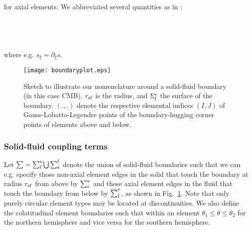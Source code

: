 %
\eqa \label{eq:scheme_wu_ax}
 \nonumber\\
\ena
%
for axial elements. We abbreviated several quantities as
in \citet[][Table~1]{nissen+:07b}:
%
\eqa
{}\nonumber\\
\nonumber\\
\nonumber\\
\nonumber\\
\nonumber\\
\nonumber
\ena
%
where e.g. $s_\xi=\partial_\xi s$.
%
\begin{figure}[b!]
\begin{center}
\texttt{[image: boundaryplot.eps]}
\caption{Sketch to illustrate our nomenclature around a solid-fluid boundary
(in this case CMB). $r_{\rm sf}$ is the radius, and $\Sigma_{\rm f}^{\rm s}$
the surface of the boundary. $(.,.)$ denote the respective elemental indices
$(I,J)$ of Gauss-Lobatto-Legendre points of the boundary-hugging corner
points of elements above and below.}
\label{img:bdry}
\end{center}
\end{figure}
%
\subsubsection{Solid-fluid coupling terms}
%
Let $\sum=\sum^{\rm s}_{\rm f}\bigcup\sum^{\rm f}_{\rm s}$ denote the union
of solid-fluid boundaries such that we can e.g. specify those non-axial
element edges in the solid that touch the boundary at radius $r_{\rm sf}$
from above by $\sum^{\rm s}_e$ and those axial element edges in the fluid that
touch the boundary from below by $\overline{\sum}_{\rm f}^e$, as shown in
Fig.~\ref{img:bdry}. Note that only purely circular element types
\citep[see][Appendix~A]{nissen+:07b} may be located at
discontinuities.
We also define the colatitudinal element boundaries such that within an element
$\theta_1\leq\theta\leq\theta_2$ for the northern hemisphere and vice versa
for the southern hemisphere.

